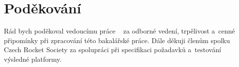 \chapter*{Poděkování}

Rád bych poděkoval vedoucímu práce \supervisortitle~\supervisor{} za odborné vedení, trpělivost a~cenné připomínky při zpracování této bakalářské práce. Dále děkuji členům spolku Czech Rocket Society za spolupráci při specifikaci požadavků a~testování výsledné platformy.

\clearpage

